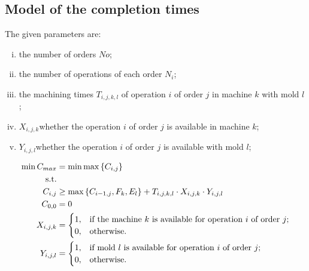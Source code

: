 \documentclass{article}
\begin{document}
	\subsection{Model of the completion times}
	The given parameters are:
	\begin{enumerate}[i.]
		\item the number of orders $ No $;\\
		\item the number of operations of each order $ N_i $;\\
		\item the machining times $ T_{i,j,k,l} $ of operation $ i $ of order $ j $ in machine $ k $ with mold $ l $;\\
		\item $ X_{i,j,k} $whether the operation $ i $ of order $ j $ is available in machine $ k $;\\
		\item $ Y_{i,j,l} $whether the operation $ i $ of order $ j $ is available with mold $ l $;\\
	\end{enumerate}
	\begin{align}
		\min C_{max} &= \min \max\left\{C_{i,j}\right\} \label{obj}\\
		\text{s.t.} \nonumber \\
		C_{i,j} &\geq \max \left\{C_{i-1,j}, F_k, E_l\right\} + T_{i,j,k,l}\cdot X_{i,j,k}\cdot Y_{i,j,l}\\
		C_{0,0}&=0\\
		X_{i,j,k}&=\begin{cases}
			1, &\text{if the machine $ k $ is available for operation $ i $ of order $ j $};\\
			0,&\text{otherwise}.
		\end{cases}\\
		Y_{i,j,l}&=\begin{cases}
			1, &\text{if mold $ l $ is available for operation $ i $ of order $ j $};\\
			0,&\text{otherwise}.
		\end{cases}
	\end{align}
\end{document}
